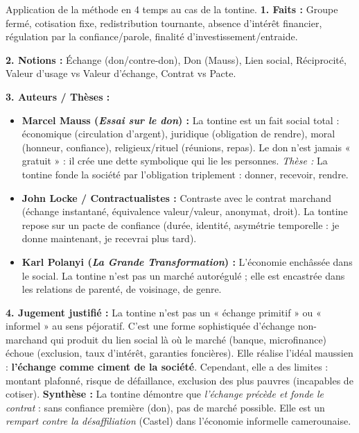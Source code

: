 \documentclass[11pt]{article}
\newcommand{\cle}[1]{{\popxbold\color{popdark}#1}}
\begin{document}
\begin{exoresolu}
Application de la méthode en 4 temps au cas de la tontine.
\tcblower
\textbf{1. Faits :} Groupe fermé, cotisation fixe, redistribution tournante, absence d'intérêt financier, régulation par la confiance/parole, finalité d'investissement/entraide.

\textbf{2. Notions :} \cle{Échange} (don/contre-don), \cle{Don} (Mauss), \cle{Lien social}, \cle{Réciprocité}, \cle{Valeur d'usage} vs \cle{Valeur d'échange}, \cle{Contrat} vs \cle{Pacte}.

\textbf{3. Auteurs / Thèses :}
\begin{itemize}
    \item \textbf{Marcel Mauss (\emph{Essai sur le don}) :} La tontine est un \cle{fait social total} : économique (circulation d'argent), juridique (obligation de rendre), moral (honneur, confiance), religieux/rituel (réunions, repas). Le don n'est jamais « gratuit » : il crée une \cle{dette symbolique} qui lie les personnes. \emph{Thèse :} La tontine fonde la société par l'obligation triplement : donner, recevoir, rendre.
    \item \textbf{John Locke / Contractualistes :} Contraste avec le \cle{contrat marchand} (échange instantané, équivalence valeur/valeur, anonymat, droit). La tontine repose sur un \cle{pacte de confiance} (durée, identité, asymétrie temporelle : je donne maintenant, je recevrai plus tard).
    \item \textbf{Karl Polanyi (\emph{La Grande Transformation}) :} L'économie \cle{enchâssée} dans le social. La tontine n'est pas un marché autorégulé ; elle est encastrée dans les relations de parenté, de voisinage, de genre.
\end{itemize}

\textbf{4. Jugement justifié :}
La tontine n'est pas un « échange primitif » ou « informel » au sens péjoratif. C'est une \cle{forme sophistiquée d'échange non-marchand} qui produit du \cle{lien social} là où le marché (banque, microfinance) échoue (exclusion, taux d'intérêt, garanties foncières). Elle réalise l'idéal maussien : \textbf{l'échange comme ciment de la société}. Cependant, elle a des limites : montant plafonné, risque de défaillance, exclusion des plus pauvres (incapables de cotiser). \textbf{Synthèse :} La tontine démontre que \emph{l'échange précède et fonde le contrat} : sans confiance première (don), pas de marché possible. Elle est un \emph{rempart contre la désaffiliation} (Castel) dans l'économie informelle camerounaise.
\end{exoresolu}
\end{document}
